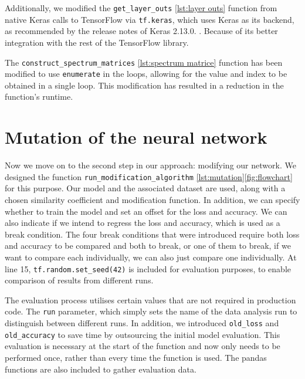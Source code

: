 Additionally, we modified the \texttt{get\_layer\_outs} \ref{lst:layer outs} function from native Keras \cite{chollet_keras_2015} calls to TensorFlow \cite{martin_abadi_tensorflow_2015} via \texttt{tf.keras}, which uses Keras as its backend, as recommended by the release notes of Keras 2.13.0. .
Because of its better integration with the rest of the TensorFlow library.



The \texttt{construct\_spectrum\_matrices} \ref{lst:spectrum matrice} function has been modified to use \texttt{enumerate} in the loops, allowing for the value and index to be obtained in a single loop.
This modification has resulted in a reduction in the function's runtime.




\section*{Mutation of the neural network}
Now we move on to the second step in our approach: modifying our network.
We designed the function \texttt{run\_modification\_algorithm} \ref{lst:mutation}\ref{fig:flowchart} for this purpose.
Our model and the associated dataset are used, along with a chosen similarity coefficient and modification function.
In addition, we can specify whether to train the model and set an offset for the loss and accuracy.
We can also indicate if we intend to regress the loss and accuracy, which is used as a break condition.
The four break conditions that were introduced require both loss and accuracy to be compared and both to break, or one of them to break, if we want to compare each individually, we can also just compare one individually.
At line 15, \texttt{tf.random.set\_seed(42)} is included for evaluation purposes, to enable comparison of results from different runs.

The evaluation process utilises certain values that are not required in production code.
The \texttt{run} parameter, which simply sets the name of the data analysis run to distinguish between different runs.
In addition, we introduced \texttt{old\_loss} and \texttt{old\_accuracy} to save time by outsourcing the initial model evaluation.
This evaluation is necessary at the start of the function and now only needs to be performed once, rather than every time the function is used.
The pandas functions are also included to gather evaluation data.

